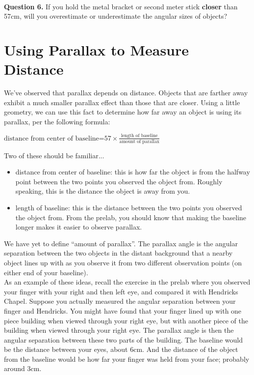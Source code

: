 \documentclass[11pt]{article}
\begin{document}
\vspace{1.5cm}
\hrulefill\\

\textbf{Question 6.} If you hold the metal bracket or second meter stick \textbf{closer} than 57cm, will you overestimate or underestimate the angular sizes of objects?\\

\vspace{1.5cm}
\hrulefill

\newpage

\section{Using Parallax to Measure Distance}

We've observed that parallax depends on distance. Objects that are farther away exhibit a much smaller parallax effect than those that are closer. Using a little geometry, we can use this fact to determine how far away an object is using its parallax, per the following formula:

\begin{center}
	$\text{distance from center of baseline=}57\times\frac{\text{length of baseline}}{\text{amount of parallax}}$
\end{center}

Two of these should be familiar...
\begin{itemize}
	\item distance from center of baseline: this is how far the object is from the halfway point between the two points you observed the object from. Roughly speaking, this is the distance the object is away from you.
	\item length of baseline: this is the distance between the two points you observed the object from. From the prelab, you should know that making the baseline longer makes it easier to observe parallax.
\end{itemize}
We have yet to define ``amount of parallax''. The parallax angle is the angular separation between the two objects in the distant background that a nearby object lines up with as you observe it from two different observation points (on either end of your baseline).\\

As an example of these ideas, recall the exercise in the prelab where you observed your finger with your right and then left eye, and compared it with Hendricks Chapel. Suppose you actually measured the angular separation between your finger and Hendricks. You might have found that your finger lined up with one piece building when viewed through your right eye, but with another piece of the building when viewed through your right eye. The parallax angle is then the angular separation between these two parts of the building. The baseline would be the distance between your eyes, about 6cm. And the distance of the object from the baseline would be how far your finger was held from your face; probably around 3cm. \\
\end{document}
